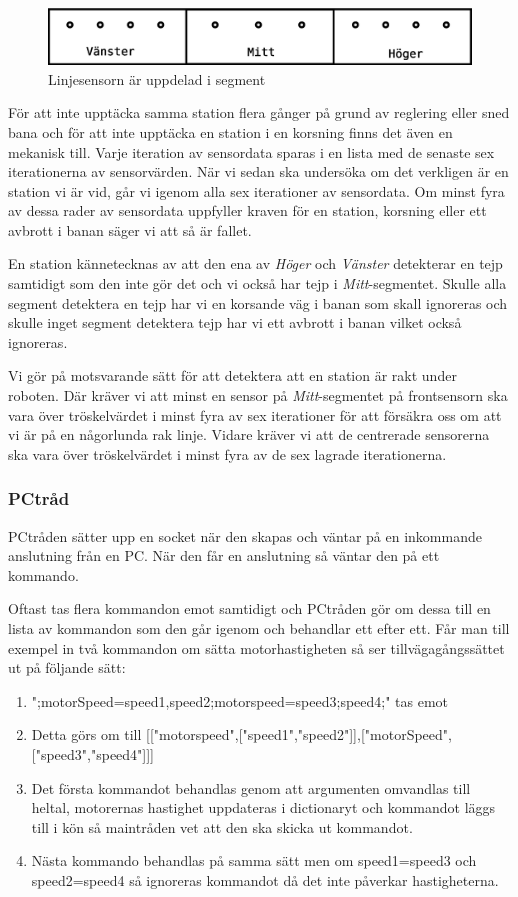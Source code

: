 \begin{figure}[h!]
	\centering
	\includegraphics[scale=0.4]{grafik/huvud-linjesensor}
	\caption{Linjesensorn är uppdelad i segment} \label{huvud-linjesensor}
\end{figure}

För att inte upptäcka samma station flera gånger på grund av reglering eller sned bana och för att inte upptäcka en station i en korsning finns det även en mekanisk till. Varje iteration av sensordata sparas i en lista med de senaste sex iterationerna av sensorvärden. När vi sedan ska undersöka om det verkligen är en station vi är vid, går vi igenom alla sex iterationer av sensordata. Om minst fyra av dessa rader av sensordata uppfyller kraven för en station, korsning eller ett avbrott i banan säger vi att så är fallet.

En station kännetecknas av att den ena av \textit{Höger} och \textit{Vänster} detekterar en tejp samtidigt som den inte gör det och vi också har tejp i \textit{Mitt}-segmentet. Skulle alla segment detektera en tejp har vi en korsande väg i banan som skall ignoreras och skulle inget segment detektera tejp har vi ett avbrott i banan vilket också ignoreras.

Vi gör på motsvarande sätt för att detektera att en station är rakt under roboten. Där kräver vi att minst en sensor på \textit{Mitt}-segmentet på frontsensorn ska vara över tröskelvärdet i minst fyra av sex iterationer för att försäkra oss om att vi är på en någorlunda rak linje. Vidare kräver vi att de centrerade sensorerna ska vara över tröskelvärdet i minst fyra av de sex lagrade iterationerna.

\subsubsection{PCtråd}
PCtråden sätter upp en socket när den skapas och väntar på en inkommande anslutning från en PC. När den får en anslutning så väntar den på ett kommando.

Oftast tas flera kommandon emot samtidigt och PCtråden gör om dessa till en lista av kommandon som den går igenom och behandlar ett efter ett. Får man till exempel in två kommandon om sätta motorhastigheten så ser tillvägagångssättet ut på följande sätt:
\begin{enumerate}
\item ";motorSpeed=speed1,speed2;motorspeed=speed3;speed4;" tas emot
\item Detta görs om till [["motorspeed",["speed1","speed2"]],["motorSpeed",["speed3","speed4"]]]
\item Det första kommandot behandlas genom att argumenten omvandlas till heltal, motorernas hastighet uppdateras i dictionaryt och kommandot läggs till i kön så maintråden vet att den ska skicka ut kommandot.
\item Nästa kommando behandlas på samma sätt men om speed1=speed3 och speed2=speed4 så ignoreras kommandot då det inte påverkar hastigheterna.
\end{enumerate}

